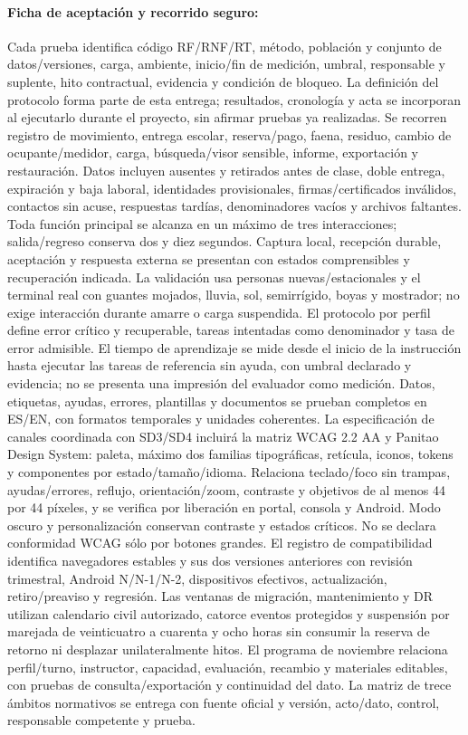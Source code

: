 \paragraph{Ficha de aceptación y recorrido seguro:}
Cada prueba identifica código RF/RNF/RT, método, población y conjunto de datos/versiones, carga, ambiente, inicio/fin de medición, umbral, responsable y suplente, hito contractual, evidencia y condición de bloqueo. La definición del protocolo forma parte de esta entrega; resultados, cronología y acta se incorporan al ejecutarlo durante el proyecto, sin afirmar pruebas ya realizadas.
Se recorren registro de movimiento, entrega escolar, reserva/pago, faena, residuo, cambio de ocupante/medidor, carga, búsqueda/visor sensible, informe, exportación y restauración. Datos incluyen ausentes y retirados antes de clase, doble entrega, expiración y baja laboral, identidades provisionales, firmas/certificados inválidos, contactos sin acuse, respuestas tardías, denominadores vacíos y archivos faltantes. Toda función principal se alcanza en un máximo de tres interacciones; salida/regreso conserva dos y diez segundos. Captura local, recepción durable, aceptación y respuesta externa se presentan con estados comprensibles y recuperación indicada.
La validación usa personas nuevas/estacionales y el terminal real con guantes mojados, lluvia, sol, semirrígido, boyas y mostrador; no exige interacción durante amarre o carga suspendida. El protocolo por perfil define error crítico y recuperable, tareas intentadas como denominador y tasa de error admisible. El tiempo de aprendizaje se mide desde el inicio de la instrucción hasta ejecutar las tareas de referencia sin ayuda, con umbral declarado y evidencia; no se presenta una impresión del evaluador como medición.
Datos, etiquetas, ayudas, errores, plantillas y documentos se prueban completos en ES/EN, con formatos temporales y unidades coherentes. La especificación de canales coordinada con SD3/SD4 incluirá la matriz WCAG 2.2 AA y Panitao Design System: paleta, máximo dos familias tipográficas, retícula, iconos, tokens y componentes por estado/tamaño/idioma. Relaciona teclado/foco sin trampas, ayudas/errores, reflujo, orientación/zoom, contraste y objetivos de al menos 44 por 44 píxeles, y se verifica por liberación en portal, consola y Android. Modo oscuro y personalización conservan contraste y estados críticos. No se declara conformidad WCAG sólo por botones grandes. El registro de compatibilidad identifica navegadores estables y sus dos versiones anteriores con revisión trimestral, Android N/N-1/N-2, dispositivos efectivos, actualización, retiro/preaviso y regresión.
Las ventanas de migración, mantenimiento y DR utilizan calendario civil autorizado, catorce eventos protegidos y suspensión por marejada de veinticuatro a cuarenta y ocho horas sin consumir la reserva de retorno ni desplazar unilateralmente hitos. El programa de noviembre relaciona perfil/turno, instructor, capacidad, evaluación, recambio y materiales editables, con pruebas de consulta/exportación y continuidad del dato. La matriz de trece ámbitos normativos se entrega con fuente oficial y versión, acto/dato, control, responsable competente y prueba.

